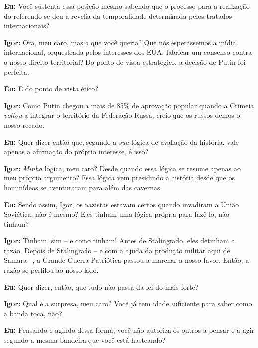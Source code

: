 \textbf{Eu:} Você sustenta essa posição mesmo sabendo que o processo
para a realização do referendo se deu à revelia da temporalidade
determinada pelos tratados internacionais?

\textbf{Igor:} Ora, meu caro, mas o que você queria? Que nós
esperássemos a mídia internacional, orquestrada pelos interesses dos
EUA, fabricar um consenso contra o nosso direito territorial? Do ponto
de vista estratégico, a decisão de Putin foi perfeita.

\textbf{Eu:} E do ponto de vista ético?

\textbf{Igor:} Como Putin chegou a mais de 85\% de aprovação popular
quando a Crimeia \emph{voltou} a integrar o território da Federação
Russa, creio que os russos demos o nosso recado.

\textbf{Eu:} Quer dizer então que, segundo a \emph{sua} lógica de
avaliação da história, vale apenas a afirmação do próprio interesse, é
isso?

\textbf{Igor:} \emph{Minha} lógica, meu caro? Desde quando essa lógica
se resume apenas ao meu próprio argumento? Essa lógica vem presidindo a
história desde que os hominídeos se aventuraram para além das cavernas.

\textbf{Eu:} Sendo assim, Igor, os nazistas estavam certos quando
invadiram a União Soviética, não é mesmo? Eles tinham uma lógica própria
para fazê-lo, não tinham?

\textbf{Igor:} Tinham, sim -- e como tinham! Antes de Stalingrado, eles
detinham a razão. Depois de Stalingrado -- e com a ajuda da produção
militar aqui de Samara --, a Grande Guerra Patriótica passou a marchar a
nosso favor. Então, a razão se perfilou ao nosso lado.

\textbf{Eu:} Quer dizer, então, que tudo não passa da lei do mais forte?

\textbf{Igor:} Qual é a surpresa, meu caro? Você já tem idade suficiente
para saber como a banda toca, não?

\textbf{Eu:} Pensando e agindo dessa forma, você não autoriza os outros
a pensar e a agir segundo a mesma bandeira que você está hasteando?

